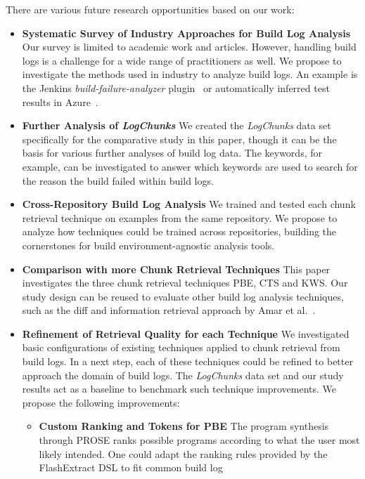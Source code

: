 There are various future research opportunities based on our work:
\begin{itemize}
  \item \textbf{Systematic Survey of Industry Approaches for Build
  Log Analysis} Our survey is limited to academic work and articles.
  However, handling build logs is a challenge for a wide range of
  practitioners as well.
  We propose to investigate the methods used in industry to analyze
  build logs.
  An example is the Jenkins \emph{build-failure-analyzer}
  plugin~\cite{jenkins2020failure-analyzer} or automatically
  inferred test results in Azure~\cite{azure2020inferred}.
  \item \textbf{Further Analysis of \emph{LogChunks}} We created the
  \emph{LogChunks} data set \cite{brandt2020logchunks} specifically for
  the comparative
  study in this paper, though it can be the basis for various further
  analyses of build log data.
  The keywords, for example, can be
  investigated to answer which keywords are used to search for the
  reason the build failed within build logs.
  \item \textbf{Cross-Repository Build Log Analysis} We trained and
  tested each chunk retrieval technique on examples from the same
  repository.
  We propose to analyze how techniques could be trained
  across repositories, building the cornerstones for build
  environment-agnostic analysis tools.
  \item \textbf{Comparison with more Chunk Retrieval Techniques} This
  paper investigates the three chunk retrieval techniques PBE, CTS and
  KWS\@.
  Our study design can be reused to evaluate other build log
  analysis techniques, such as the diff and information retrieval
  approach by Amar et al.~\cite{amar2019mining}.
  \item \textbf{Refinement of Retrieval Quality for each Technique} We
  investigated basic configurations of existing techniques applied to
  chunk retrieval from build logs.
  In a next step, each of these
  techniques could be refined to better approach the domain of build
  logs.
  The \emph{LogChunks} data set and our study results act as a
  baseline to benchmark such technique improvements.
  We propose the
  following improvements:
    \begin{itemize}
      \item \textbf{Custom Ranking and Tokens for PBE} The program
      synthesis through PROSE ranks possible programs according to
      what the user most likely intended.
      One could adapt the ranking
      rules provided by the FlashExtract DSL to fit common build log

\end{itemize}
\end{itemize}
